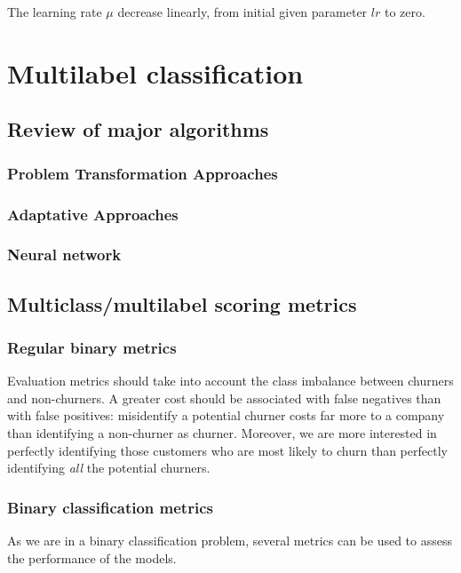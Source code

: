 The learning rate $\mu$ decrease linearly, from initial given parameter $lr$ to zero.





\pagebreak
\section{Multilabel classification}
\subsection{Review of major algorithms}
\subsubsection{Problem Transformation Approaches}
\subsubsection{Adaptative Approaches}
\subsubsection{Neural network}

\subsection{Multiclass/multilabel scoring metrics}
\subsubsection{Regular binary metrics}


Evaluation metrics should take into account the class imbalance between churners and non-churners. A greater cost should be associated with false negatives than with false positives: misidentify a potential churner costs far more to a company than identifying a non-churner as churner. Moreover, we are more interested in perfectly identifying those customers who are most likely to churn than perfectly identifying \textit{all} the potential churners.

\subsubsection{Binary classification metrics}

As we are in a binary classification problem, several metrics can be used to assess the performance of the models.

